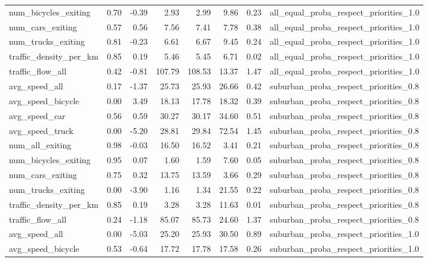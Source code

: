 \begin{table}[ht]
\begin{tabular}{lrrrrrrl}
  num\_bicycles\_exiting & 0.70 & -0.39 & 2.93 & 2.99 & 9.86 & 0.23 & all\_equal\_proba\_respect\_priorities\_1.0 \\ 
  num\_cars\_exiting & 0.57 & 0.56 & 7.56 & 7.41 & 7.78 & 0.38 & all\_equal\_proba\_respect\_priorities\_1.0 \\ 
  num\_trucks\_exiting & 0.81 & -0.23 & 6.61 & 6.67 & 9.45 & 0.24 & all\_equal\_proba\_respect\_priorities\_1.0 \\ 
  traffic\_density\_per\_km & 0.85 & 0.19 & 5.46 & 5.45 & 6.71 & 0.02 & all\_equal\_proba\_respect\_priorities\_1.0 \\ 
  traffic\_flow\_all & 0.42 & -0.81 & 107.79 & 108.53 & 13.37 & 1.47 & all\_equal\_proba\_respect\_priorities\_1.0 \\ 
  avg\_speed\_all & 0.17 & -1.37 & 25.73 & 25.93 & 26.66 & 0.42 & suburban\_proba\_respect\_priorities\_0.8 \\ 
  avg\_speed\_bicycle & 0.00 & 3.49 & 18.13 & 17.78 & 18.32 & 0.39 & suburban\_proba\_respect\_priorities\_0.8 \\ 
  avg\_speed\_car & 0.56 & 0.59 & 30.27 & 30.17 & 34.60 & 0.51 & suburban\_proba\_respect\_priorities\_0.8 \\ 
  avg\_speed\_truck & 0.00 & -5.20 & 28.81 & 29.84 & 72.54 & 1.45 & suburban\_proba\_respect\_priorities\_0.8 \\ 
  num\_all\_exiting & 0.98 & -0.03 & 16.50 & 16.52 & 3.41 & 0.21 & suburban\_proba\_respect\_priorities\_0.8 \\ 
  num\_bicycles\_exiting & 0.95 & 0.07 & 1.60 & 1.59 & 7.60 & 0.05 & suburban\_proba\_respect\_priorities\_0.8 \\ 
  num\_cars\_exiting & 0.75 & 0.32 & 13.75 & 13.59 & 3.66 & 0.29 & suburban\_proba\_respect\_priorities\_0.8 \\ 
  num\_trucks\_exiting & 0.00 & -3.90 & 1.16 & 1.34 & 21.55 & 0.22 & suburban\_proba\_respect\_priorities\_0.8 \\ 
  traffic\_density\_per\_km & 0.85 & 0.19 & 3.28 & 3.28 & 11.63 & 0.01 & suburban\_proba\_respect\_priorities\_0.8 \\ 
  traffic\_flow\_all & 0.24 & -1.18 & 85.07 & 85.73 & 24.60 & 1.37 & suburban\_proba\_respect\_priorities\_0.8 \\ 
  avg\_speed\_all & 0.00 & -5.03 & 25.20 & 25.93 & 30.50 & 0.89 & suburban\_proba\_respect\_priorities\_1.0 \\ 
  avg\_speed\_bicycle & 0.53 & -0.64 & 17.72 & 17.78 & 17.58 & 0.26 & suburban\_proba\_respect\_priorities\_1.0 \\ 

\end{tabular}
\end{table}
